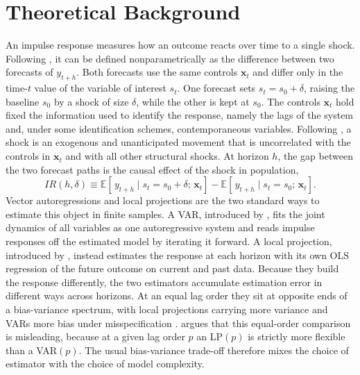 
\section{Theoretical Background}

An impulse response measures how an outcome reacts over time to a single shock.
Following \textcite{koop1996impulse}, it can be defined nonparametrically as the
difference between two forecasts of $y_{t+h}$. Both forecasts use the same controls
$\mathbf{x}_t$ and differ only in the time-$t$ value of the variable of interest $s_t$.
One forecast sets $s_t = s_0 + \delta$, raising the baseline $s_0$ by a shock of size
$\delta$, while the other is kept at $s_0$. The controls $\mathbf{x}_t$ hold fixed the
information used to identify the response, namely the lags of the system and, under some
identification schemes, contemporaneous variables. Following \textcite{ramey2016macroeconomic},
a shock is an exogenous and unanticipated movement that is uncorrelated with the controls in
$\mathbf{x}_t$ and with all other structural shocks. At horizon $h$, the gap between the two
forecast paths is the causal effect of the shock in population,
%
\begin{equation}
    IR(h,\delta) \equiv
    \mathbb{E}\!\left[\,y_{t+h} \mid s_t = s_0 + \delta;\, \mathbf{x}_t\right]
    - \mathbb{E}\!\left[\,y_{t+h} \mid s_t = s_0;\, \mathbf{x}_t\right].
    \label{eq:EF_IRF}
\end{equation}
%
Vector autoregressions and local projections are the two standard ways to estimate this
object in finite samples. A VAR, introduced by \textcite{sims1980macroeconomics}, fits the
joint dynamics of all variables as one autoregressive system and reads impulse responses off
the estimated model by iterating it forward. A local projection, introduced by
\textcite{jorda2005estimation}, instead estimates the response at each horizon with its own
OLS regression of the future outcome on current and past data. Because they build the response differently, the two estimators accumulate estimation error in different ways across
horizons. At an equal lag order they sit at opposite ends of a bias-variance spectrum, with
local projections carrying more variance and VARs more bias under misspecification
\parencites{li2024local}{olea2025local}. \textcite{ludwig2026local} argues that this
equal-order comparison is misleading, because at a given lag order $p$ an LP$(p)$ is strictly
more flexible than a VAR$(p)$. The usual bias-variance trade-off therefore mixes the choice of
estimator with the choice of model complexity.

